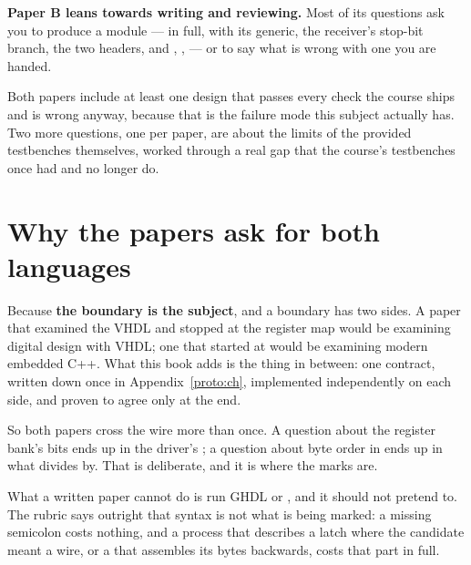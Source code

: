 \textbf{Paper B leans towards writing and reviewing.} Most of its questions ask you to produce a
module ---  in full,  with its generic, the receiver's stop-bit branch, the
two  headers,  and , ,
 --- or to say what is wrong with one you are handed.

Both papers include at least one design that passes every check the course ships and is wrong
anyway, because that is the failure mode this subject actually has. Two more questions, one per
paper, are about the limits of the provided testbenches themselves, worked through a real gap that
the course's testbenches once had and no longer do.

\section*{Why the papers ask for both languages}
Because \textbf{the boundary is the subject}, and a boundary has two sides. A paper that examined
the VHDL and stopped at the register map would be examining digital design with VHDL; one that
started at  would be examining modern embedded C++. What this book adds is the thing
in between: one contract, written down once in Appendix~\ref{proto:ch}, implemented independently
on each side, and proven to agree only at the end.

So both papers cross the wire more than once. A question about the register bank's 
bits ends up in the driver's ; a question about byte order in  ends up
in what  divides by. That is deliberate, and it is where the marks are.

What a written paper cannot do is run GHDL or , and it should not pretend to. The
rubric says outright that syntax is not what is being marked: a missing semicolon costs nothing, and
a process that describes a latch where the candidate meant a wire, or a  that
assembles its bytes backwards, costs that part in full.

